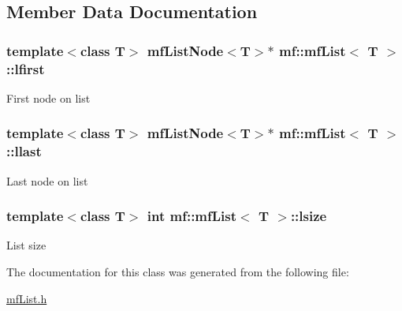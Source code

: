 \subsection{Member Data Documentation}
\hypertarget{classmf_1_1mfList_a814cc8674a44ba839f7cbbcc6a4bb172}{
\subsubsection[{lfirst}]{\setlength{\rightskip}{0pt plus 5cm}template$<$class T$>$ {\bf mfListNode}$<$T$>$$\ast$ {\bf mf::mfList}$<$ T $>$::{\bf lfirst}}}
\label{classmf_1_1mfList_a814cc8674a44ba839f7cbbcc6a4bb172}
First node on list \hypertarget{classmf_1_1mfList_a5c24c5c4cf0d4807f181cf9ae36dd028}{
\subsubsection[{llast}]{\setlength{\rightskip}{0pt plus 5cm}template$<$class T$>$ {\bf mfListNode}$<$T$>$$\ast$ {\bf mf::mfList}$<$ T $>$::{\bf llast}}}
\label{classmf_1_1mfList_a5c24c5c4cf0d4807f181cf9ae36dd028}
Last node on list \hypertarget{classmf_1_1mfList_a05d51ad01af004b129160206f8434ff9}{
\subsubsection[{lsize}]{\setlength{\rightskip}{0pt plus 5cm}template$<$class T$>$ int {\bf mf::mfList}$<$ T $>$::{\bf lsize}}}
\label{classmf_1_1mfList_a05d51ad01af004b129160206f8434ff9}
List size 

The documentation for this class was generated from the following file:\begin{DoxyCompactItemize}
\item 
\hyperlink{mfList_8h}{mfList.h}\end{DoxyCompactItemize}
